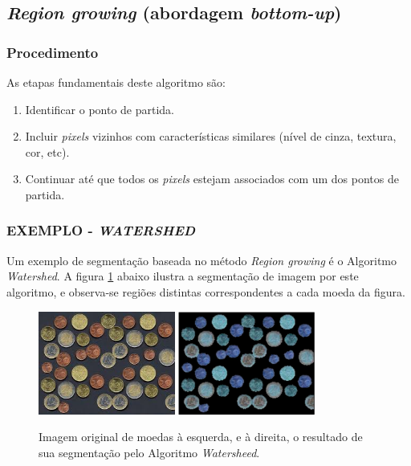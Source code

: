 \subsection{\textit{Region growing} (abordagem \textit{bottom-up})}
\subsubsection{Procedimento}
As etapas fundamentais deste algoritmo são: 
\begin{enumerate}
    \item Identificar o ponto de partida.
    \item Incluir \textit{pixels} vizinhos com características similares (nível de cinza, textura, cor, etc).
    \item Continuar até que todos os \textit{pixels} estejam associados com um dos pontos de partida.
\end{enumerate}

\subsubsection{EXEMPLO - \textit{WATERSHED}}
Um exemplo de segmentação baseada no método \textit{Region growing} é o Algoritmo \textit{Watershed}. A figura \ref{fig:coins} abaixo ilustra a segmentação de imagem por este algoritmo, e observa-se regiões distintas correspondentes a cada moeda da figura.

\begin{figure}[!htb]
 \centering
 \def\baselinestretch{1}\small\normalsize
 \includegraphics[width=0.4\textwidth]{img/stf-coins.jpg}\qquad
 \includegraphics[width=0.4\textwidth]{img/stf-coins-watersheed.jpg} 
 \caption{\label{fig:coins}Imagem original de moedas à esquerda, e à direita, o resultado de sua segmentação pelo Algoritmo \textit{Watersheed}. \citep{stanford}}
\end{figure}
 
 

